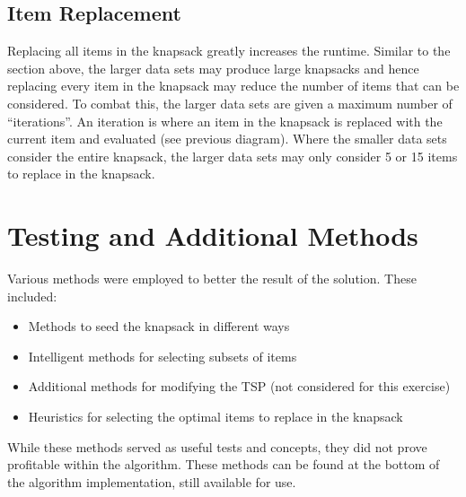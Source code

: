 \documentclass[a4paper,12pt]{article}
\begin{document}
\newpage
\subsection{Item Replacement}
Replacing all items in the knapsack greatly increases the runtime. Similar to the section above, the larger data sets may produce large knapsacks and hence replacing every item in the knapsack may reduce the number of items that can be considered. To combat this, the larger data sets are given a maximum number of ``iterations''. An iteration is where an item in the knapsack is replaced with the current item and evaluated (see previous diagram). Where the smaller data sets consider the entire knapsack, the larger data sets may only consider 5 or 15 items to replace in the knapsack. 

\section{Testing and Additional Methods}
Various methods were employed to better the result of the solution. These included:
\begin{itemize}
	\item Methods to seed the knapsack in different ways
	\item Intelligent methods for selecting subsets of items
	\item Additional methods for modifying the TSP (not considered for this exercise)
	\item Heuristics for selecting the optimal items to replace in the knapsack
\end{itemize}

While these methods served as useful tests and concepts, they did not prove profitable within the algorithm. These methods can be found at the bottom of the algorithm implementation, still available for use.
\end{document}
